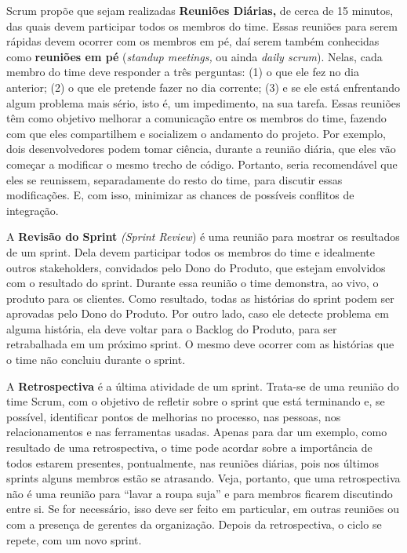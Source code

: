 \documentclass[
  11pt,
  twoside]{book}
\begin{document}
Scrum propõe que sejam realizadas \textbf{Reuniões Diárias,} de cerca de
15 minutos, das quais devem participar todos os membros do time. Essas
reuniões para serem rápidas devem ocorrer com os membros em pé, daí
serem também conhecidas como \textbf{reuniões em pé} (\emph{standup
meetings,} ou ainda \emph{daily scrum}). Nelas, cada membro do time deve
responder a três perguntas: (1) o que ele fez no dia anterior; (2) o que
ele pretende fazer no dia corrente; (3) e se ele está enfrentando algum
problema mais sério, isto é, um impedimento, na sua tarefa. Essas
reuniões têm como objetivo melhorar a comunicação entre os membros do
time, fazendo com que eles compartilhem e socializem o andamento do
projeto. Por exemplo, dois desenvolvedores podem tomar ciência, durante
a reunião diária, que eles vão começar a modificar o mesmo trecho de
código. Portanto, seria recomendável que eles se reunissem,
separadamente do resto do time, para discutir essas modificações. E, com
isso, minimizar as chances de possíveis conflitos de integração.

 

A \textbf{Revisão do Sprint} \emph{(Sprint Review}) é uma reunião para
mostrar os resultados de um sprint. Dela devem participar todos os
membros do time e idealmente outros stakeholders, convidados pelo Dono
do Produto, que estejam envolvidos com o resultado do sprint. Durante
essa reunião o time demonstra, ao vivo, o produto para os clientes. Como
resultado, todas as histórias do sprint podem ser aprovadas pelo Dono do
Produto. Por outro lado, caso ele detecte problema em alguma história,
ela deve voltar para o Backlog do Produto, para ser retrabalhada em um
próximo sprint. O mesmo deve ocorrer com as histórias que o time não
concluiu durante o sprint.

 

A \textbf{Retrospectiva} é a última atividade de um sprint. Trata-se de
uma reunião do time Scrum, com o objetivo de refletir sobre o sprint que
está terminando e, se possível, identificar pontos de melhorias no
processo, nas pessoas, nos relacionamentos e nas ferramentas usadas.
Apenas para dar um exemplo, como resultado de uma retrospectiva, o time
pode acordar sobre a importância de todos estarem presentes,
pontualmente, nas reuniões diárias, pois nos últimos sprints alguns
membros estão se atrasando. Veja, portanto, que uma retrospectiva não é
uma reunião para ``lavar a roupa suja'' e para membros ficarem
discutindo entre si. Se for necessário, isso deve ser feito em
particular, em outras reuniões ou com a presença de gerentes da
organização. Depois da retrospectiva, o ciclo se repete, com um novo
sprint.
\end{document}
